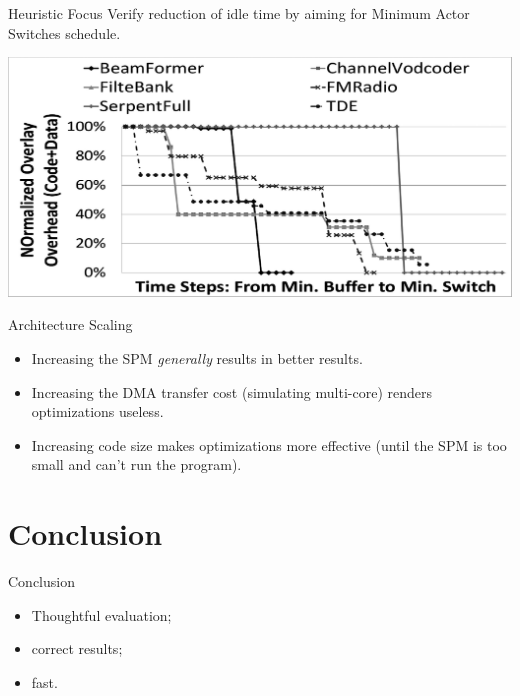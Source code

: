 \documentclass{beamer}
\begin{document}
\begin{frame}{Heuristic Focus}
  Verify reduction of idle time by aiming for Minimum Actor Switches schedule.
  \begin{center}
    \hspace*{-0.05\textwidth}
    \includegraphics[width=1.1\textwidth]{fig15}
  \end{center}
\end{frame}

\begin{frame}{Architecture Scaling}
  \begin{itemize}
    \item Increasing the SPM \textit{generally} results in better results.
    \item Increasing the DMA transfer cost (simulating multi-core) renders optimizations useless.
    \item Increasing code size makes optimizations more effective (until the SPM is too small and can't run the program).
  \end{itemize}
\end{frame}


\section*{Conclusion}

\begin{frame}{Conclusion}
  \begin{itemize}
    \item Thoughtful evaluation;
    \item correct results;
    \item fast.
  \end{itemize}
\end{frame}

\appendix
\end{document}
